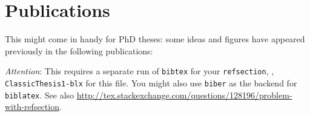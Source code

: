 \chapter*{Publications}
	This might come in handy for PhD theses: some ideas and figures have
	appeared previously in the following publications:

	\begin{refsection}[ownpubs]
		\small
		\nocite{*} %
		\printbibliography[heading=none]
	\end{refsection}

	\emph{Attention}: This requires a separate run of \texttt{bibtex} for
	your \texttt{refsection}, \eg, \texttt{ClassicThesis1-blx} for this
	file. You might also use \texttt{biber} as the backend for
	\texttt{biblatex}. See also
	\url{http://tex.stackexchange.com/questions/128196/problem-with-refsection}.
